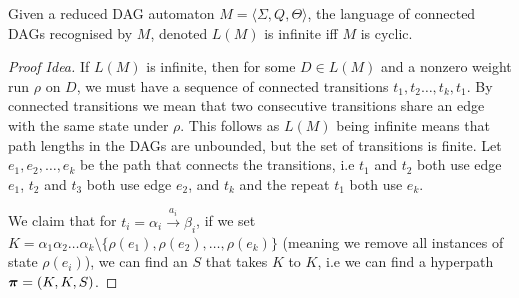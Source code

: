 \documentclass[11pt]{article}
\begin{document}
\begin{conjecture}
  Given a reduced DAG automaton $M = \langle \Sigma, Q, \Theta \rangle$, the
  language of connected DAGs recognised by $M$, denoted $L(M)$ is infinite iff
  $M$ is cyclic.
\end{conjecture}

\begin{proof}[Proof Idea]

  If $L(M)$ is infinite, then for some $D \in L(M)$ and a nonzero
  weight run $\rho$ on $D$, we must have a sequence of connected transitions
  $t_1,t_2\ldots,t_k,t_1$. By connected transitions we mean that two consecutive
  transitions share an edge with the same state under $\rho$. This follows as
  $L(M)$ being infinite means that path lengths in the DAGs are unbounded, but
  the set of transitions is finite. Let $e_1,e_2,\ldots,e_k$ be the path
  that connects the transitions, i.e $t_1$ and $t_2$ both use edge $e_1$, $t_2$
  and $t_3$ both use edge $e_2$, and $t_k$ and the repeat $t_1$ both use $e_k$.

  We claim that for $t_i = \alpha_i \xrightarrow{a_i} \beta_i$, if we set $K =
  \alpha_1 \alpha_2 \ldots \alpha_k \setminus \{\rho(e_1),\rho(e_2),
  \ldots,\rho(e_k)\}$ (meaning we remove all instances of state $\rho(e_i)$), we
  can find an $S$ that takes $K$ to $K$, i.e we can find a hyperpath $\boldsymbol{\pi} =
  (K,K,S)$. 


\end{proof}
\end{document}
